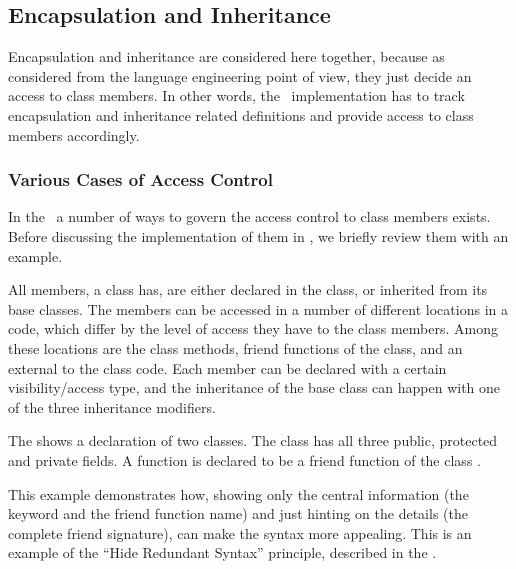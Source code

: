 \subsection{Encapsulation and Inheritance}


Encapsulation and inheritance are considered here together, because as considered from the language engineering point of view, 
they just decide an access to class members. In other words, the \pcpp\ implementation has to track
encapsulation and inheritance related definitions and provide access to class members accordingly.


\subsubsection{Various Cases of Access Control}
\label{accessandfriends}

\cppproblem

In the \cpppl\ a number of ways to govern the access control to class members exists. Before discussing 
the implementation of them in \pcpp, we briefly review them with an example.

All members, a class has, are either declared in the class, or inherited from its base classes. 
The members can be accessed in a number of different locations in a code, which differ by the level of access they have
to the class members. Among these locations are the class methods, friend functions of the class, and
an external to the class code. 
Each member can be declared with a certain visibility/access type, and the inheritance
of the base class can happen with one of the three inheritance modifiers. 



\pcppsolution


The  shows a declaration of two classes. The class  has all three
public, protected and private fields. A function  is declared to be a
friend function of  the class . 

This example demonstrates how, showing only the central information (the keyword  and the
friend function name) and just hinting on the details (the complete friend signature), can make 
the syntax more appealing. This is an example of the ``Hide Redundant Syntax'' principle, described in the .

